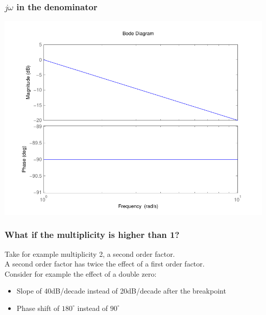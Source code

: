 \begin{frame}
\frametitle{$j\omega$ in the denominator}

\begin{center}
\includegraphics[scale=0.5]{BodeZeroDen}
\end{center}

\end{frame}



\begin{frame}
\frametitle{What if the multiplicity is higher than 1?}

Take for example multiplicity 2, a second order factor.\\
A second order factor has twice the effect of a first order factor.\\
Consider for example the effect of a double zero:
\begin{itemize}
\item Slope of 40dB/decade instead of 20dB/decade after the breakpoint
\item Phase shift of $180^{\circ}$ instead of $90^{\circ}$

\end{itemize}
\end{frame}


